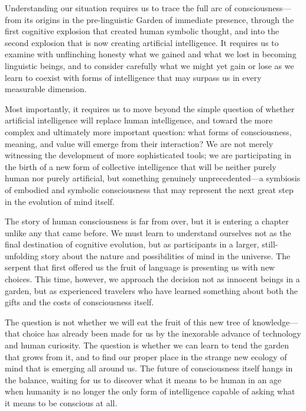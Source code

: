 \documentclass[12pt,letterpaper]{article}
\begin{document}
Understanding our situation requires us to trace the full arc of consciousness—from its origins in the pre-linguistic Garden of immediate presence, through the first cognitive explosion that created human symbolic thought, and into the second explosion that is now creating artificial intelligence. It requires us to examine with unflinching honesty what we gained and what we lost in becoming linguistic beings, and to consider carefully what we might yet gain or lose as we learn to coexist with forms of intelligence that may surpass us in every measurable dimension.

Most importantly, it requires us to move beyond the simple question of whether artificial intelligence will replace human intelligence, and toward the more complex and ultimately more important question: what forms of consciousness, meaning, and value will emerge from their interaction? We are not merely witnessing the development of more sophisticated tools; we are participating in the birth of a new form of collective intelligence that will be neither purely human nor purely artificial, but something genuinely unprecedented—a symbiosis of embodied and symbolic consciousness that may represent the next great step in the evolution of mind itself.

The story of human consciousness is far from over, but it is entering a chapter unlike any that came before. We must learn to understand ourselves not as the final destination of cognitive evolution, but as participants in a larger, still-unfolding story about the nature and possibilities of mind in the universe. The serpent that first offered us the fruit of language is presenting us with new choices. This time, however, we approach the decision not as innocent beings in a garden, but as experienced travelers who have learned something about both the gifts and the costs of consciousness itself.

The question is not whether we will eat the fruit of this new tree of knowledge—that choice has already been made for us by the inexorable advance of technology and human curiosity. The question is whether we can learn to tend the garden that grows from it, and to find our proper place in the strange new ecology of mind that is emerging all around us. The future of consciousness itself hangs in the balance, waiting for us to discover what it means to be human in an age when humanity is no longer the only form of intelligence capable of asking what it means to be conscious at all.
\end{document}

